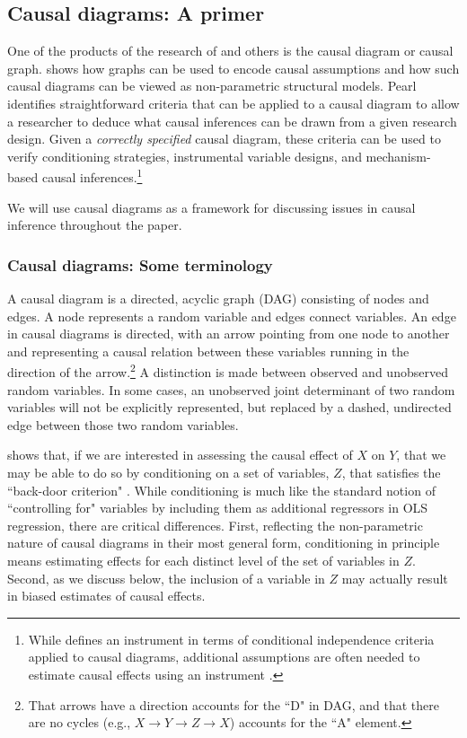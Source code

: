 \documentclass[11pt,reqno]{amsart}
\begin{document}
\begin{doublespace}
\subsection{Causal diagrams: A primer}
One of the products of the research of \citet{Pearl:2009kh} and others is the causal diagram or causal graph.
\citet{Pearl:2009kh} shows how graphs can be used to encode causal assumptions and how such causal diagrams can be viewed as non-parametric structural models.
Pearl identifies straightforward criteria that can be applied to a causal diagram to allow a researcher to deduce what causal inferences can be drawn from a given research design.
Given a \emph{correctly specified} causal diagram, these criteria can be used to verify conditioning strategies, instrumental variable designs, and mechanism-based causal inferences.\footnote{While \citet[p.248]{Pearl:2009kh} defines an instrument in terms of conditional independence criteria applied to causal diagrams, additional assumptions are often needed to estimate causal effects using an instrument \citep{Angrist:1996p7456}.}

We will use causal diagrams as a framework for discussing issues in causal inference throughout the paper.

\subsubsection{Causal diagrams: Some terminology}
A causal diagram is a directed, acyclic graph (DAG) consisting of nodes and edges.
A node represents a random variable and edges connect variables.
An edge in causal diagrams is directed, with an arrow pointing from one node to another and representing a causal relation between these variables running in the direction of the arrow.\footnote{
That arrows have a direction accounts for the ``D" in DAG, and that there are no cycles (e.g., $X \rightarrow Y \rightarrow Z \rightarrow X$) accounts for the ``A" element.}
A distinction is made between observed and unobserved random variables.
In some cases, an unobserved joint determinant of two random variables will not be explicitly represented, but replaced by a dashed, undirected edge between those two random variables.

\citet{Pearl:2009vo} shows that, if we are interested in assessing the causal effect of $X$ on $Y$, that we may be able to do so by conditioning on a set of variables, $Z$, that satisfies the ``back-door criterion" \citep[p.79]{Pearl:2009vo}.
While conditioning is much like the standard notion of ``controlling for" variables by including them as additional regressors in OLS regression, there are critical differences.
First, reflecting the non-parametric nature of causal diagrams in their most general form, conditioning in principle means estimating effects for each distinct level of the set of variables in $Z$.
Second, as we discuss below, the inclusion of a variable in $Z$ may actually result in biased estimates of causal effects. 	


\end{doublespace}
\end{document}
